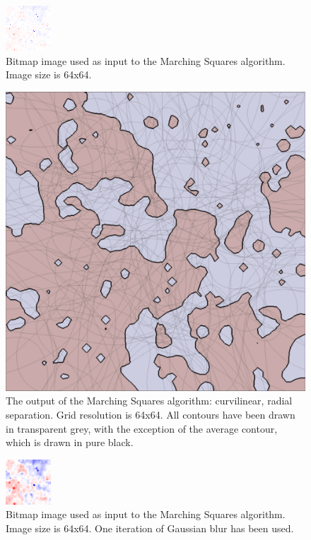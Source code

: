 \documentclass[12pt]{article}
\begin{document}
\begin{figure} 
\centering
  \includegraphics[width = 3 in]{image_avg_no_blur.png}
  \caption{Bitmap image used as input to the Marching Squares algorithm.
Image size is 64x64.
}
\end{figure}

\begin{figure} 
\centering
  \includegraphics[width = 3 in]{no_blur.png}
  \caption{The output of the Marching Squares algorithm: curvilinear, radial separation. 
Grid resolution is 64x64.
All contours have been drawn in transparent grey, with the exception of the average contour, which is drawn in pure black.
}
\end{figure}





\begin{figure} 
\centering
  \includegraphics[width = 3 in]{image_avg_1blur.png}
  \caption{Bitmap image used as input to the Marching Squares algorithm.
Image size is 64x64.
One iteration of Gaussian blur has been used.
}
\end{figure}
\end{document}
